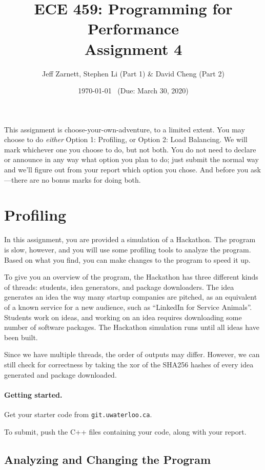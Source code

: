 \documentclass[letterpaper,10pt]{article}
\title{\bf ECE 459: Programming for Performance\\Assignment 4}
\author{Jeff Zarnett, Stephen Li (Part 1) \& David Cheng (Part 2)}
\date{\today ~ (Due: March 30, 2020)}
\begin{document}
\maketitle

This assignment is choose-your-own-adventure, to a limited extent. You may choose to do \textit{either} Option 1: Profiling, or Option 2: Load Balancing. We will mark whichever one you choose to do, but not both. You do not need to declare or announce in any way what option you plan to do; just submit the normal way and we'll figure out from your report which option you chose. And before you ask---there are no bonus marks for doing both. 


\section{Profiling}

In this assignment, you are provided a simulation of a Hackathon. The program is slow, however, and you will use some profiling tools to analyze the program. Based on what you find, you can make changes to the program to speed it up. 

To give you an overview of the program, the Hackathon has three different kinds of threads: students, idea generators, and package downloaders. The idea generates an idea the way many startup companies are pitched, as an equivalent of a known service for a new audience, such as ``LinkedIn for Service Animals''. Students work on ideas, and working on an idea requires downloading some number of software packages. The Hackathon simulation runs until all ideas have been built.

Since we have multiple threads, the order of outputs may differ. However, we can still check for correctness by taking the xor of the SHA256 hashes of every idea generated and package downloaded.

\paragraph{Getting started.} Get your starter code from \texttt{git.uwaterloo.ca}.

To submit, push the C++ files containing your code, along with your report.

\subsection{Analyzing and Changing the Program}
\end{document}
